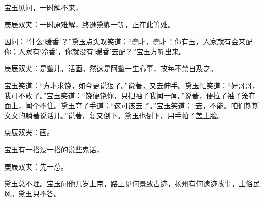 \begin{parag}
    宝玉见问，一时解不来，\begin{note}庚辰双夹：一时原难解，终逊黛卿一等，正在此等处。\end{note}因问：“什么‘暖香’？”黛玉点头叹笑道：“蠢才，蠢才！你有玉，人家就有金来配你；人家有‘冷香’，你就没有‘暖香’去配？”宝玉方听出来。\begin{note}庚辰双夹：是颦儿，活画。然这是阿颦一生心事，故每不禁自及之。\end{note}宝玉笑道：“方才求饶，如今更说狠了。”说著，又去伸手。黛玉忙笑道：“好哥哥，我可不敢了。”宝玉笑道：“饶便饶你，只把袖子我闻一闻。”说著，便拉了袖子笼在面上，闻个不住。黛玉夺了手道：“这可该去了。”宝玉笑道：“去，不能。咱们斯斯文文的躺著说话儿。”说著，复又倒下。黛玉也倒下，用手帕子盖上脸。\begin{note}庚辰双夹：画。\end{note}宝玉有一搭没一搭的说些鬼话，\begin{note}庚辰双夹：先一总。\end{note}黛玉总不理。宝玉问他几岁上京，路上见何景致古迹，扬州有何遗迹故事，土俗民风。黛玉只不答。
\end{parag}


